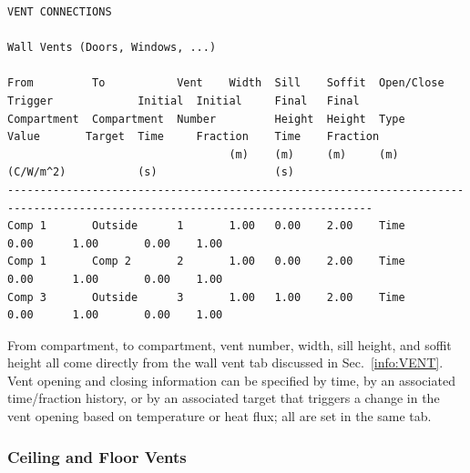 \begin{lstlisting}[basicstyle=\tiny]
VENT CONNECTIONS

Wall Vents (Doors, Windows, ...)

From         To           Vent    Width  Sill    Soffit  Open/Close  Trigger             Initial  Initial     Final   Final
Compartment  Compartment  Number         Height  Height  Type        Value       Target  Time     Fraction    Time    Fraction
                                  (m)    (m)     (m)     (m)         (C/W/m^2)           (s)                  (s)
------------------------------------------------------------------------------------------------------------------------------
Comp 1       Outside      1       1.00   0.00    2.00    Time                            0.00      1.00       0.00    1.00
Comp 1       Comp 2       2       1.00   0.00    2.00    Time                            0.00      1.00       0.00    1.00
Comp 3       Outside      3       1.00   1.00    2.00    Time                            0.00      1.00       0.00    1.00
\end{lstlisting}
From compartment, to compartment, vent number, width, sill height, and soffit height all come directly from the wall vent tab discussed in Sec.~\ref{info:VENT}. Vent opening and closing information can be specified by time, by an associated time/fraction history, or by an associated target that triggers a change in the vent opening based on temperature or heat flux; all are set in the same tab.

\subsubsection{Ceiling and Floor Vents}

